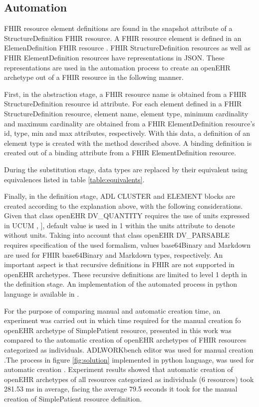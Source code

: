 \subsection{Automation}

FHIR resource element definitions are found in the snapshot attribute of a StructureDefinition FHIR resource. A FHIR resource element is defined in an ElemenDefinition FHIR resource \cite{FHIRElementDefinition}. FHIR StructureDefinition resources as well as FHIR ElementDefinition resources have representations in JSON. These representations are used in the automation process to create an openEHR archetype out of a FHIR resource in the following manner.

First, in the abstraction stage, a FHIR resource name is obtained from a FHIR StructureDefinition resource id attribute. For each element defined in a FHIR StructureDefinition resource, element name, element type, minimum cardinality and maximum cardinality are obtained from a FHIR ElementDefinition resource's  id, type, min and max attributes, respectively. With this data, a definition of an element type is created with the method described above. A binding definition is created out of a binding attribute from a FHIR ElementDefinition resource.

During the substitution stage, data types are replaced by their equivalent using equivalences listed in table \ref{table:equivalents}.

Finally, in the definition stage, ADL CLUSTER and ELEMENT blocks are created according to the explanation above, with the following considerations. Given that class openEHR DV\_QUANTITY requires the use of units expressed in UCUM \cite{UCUM}, ], default value is used in 1 within the units attribute to denote without units. Taking into account that class openEHR DV\_PARSABLE requires specification of the used formalism, values base64Binary and Markdown are used for FHIR base64Binary and Markdown types, respectively. An important aspect is that recursive definitions in FHIR are not supported in openEHR archetypes. These recursive definitions are limited to level 1 depth in the definition stage. An implementation of the automated process in python language is available in \cite{PythonImplementation}.

For the purpose of comparing manual and automatic creation time, an experiment was carried out in which time required for the manual creation fo openEHR archetype of SimplePatient resource, presented in this work was compared to the automatic creation of openEHR archetypes of FHIR resources categorized as individuals. ADLWORKbench editor was used for manual creation \cite{ADLWORKbench}.The process in figure \ref{fig:solution} implemented in python language, was used for automatic creation \cite{PythonImplementation}. Experiment results showed that automatic creation of openEHR archetypes of all resources categorized as individuals (6 resources) took 281.53 ms in average, facing the average 79.5 seconds it took for the manual creation of SimplePatient resource definition.
